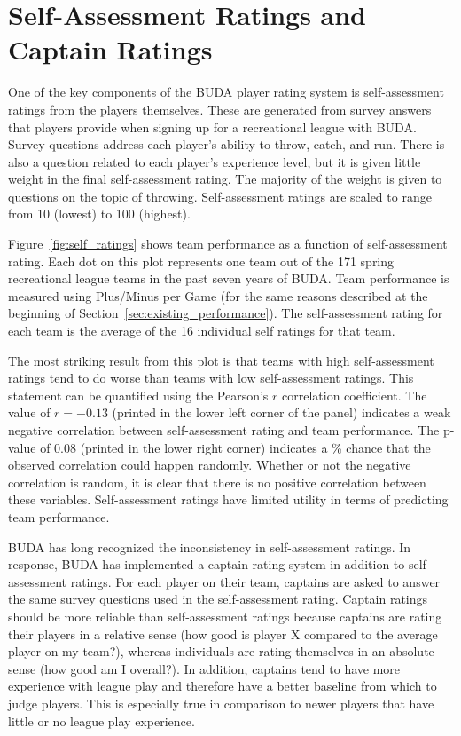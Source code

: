\section{Self-Assessment Ratings and Captain Ratings}\label{sec:self_rating}

One of the key components of the BUDA player rating system is self-assessment ratings from the players themselves.  These are generated from survey answers that players provide when signing up for a recreational league with BUDA. Survey questions address each player's ability to throw, catch, and run.  There is also a question related to each player's experience level, but it is given little weight in the final self-assessment rating. The majority of the weight is given to questions on the topic of throwing. Self-assessment ratings are scaled to range from 10 (lowest) to 100 (highest).

Figure~\ref{fig:self_ratings} shows team performance as a function of self-assessment rating. Each dot on this plot represents one team out of the 171 spring recreational league teams in the past seven years of BUDA.  Team performance is measured using Plus/Minus per Game (for the same reasons described at the beginning of Section~\ref{sec:existing_performance}). The self-assessment rating for each team is the average of the 16 individual self ratings for that team.

The most striking result from this plot is that teams with high self-assessment ratings tend to do worse than teams with low self-assessment ratings. This statement can be quantified using the Pearson's $r$ correlation coefficient. The value of $r = -0.13$ (printed in the lower left corner of the panel) indicates a weak negative correlation between self-assessment rating and team performance.   The p-value of 0.08 (printed in the lower right corner) indicates a \% chance that the observed correlation could happen randomly. Whether or not the negative correlation is random, it is clear that there is no positive correlation between these variables.  Self-assessment ratings have limited utility in terms of predicting team performance.

BUDA has long recognized the inconsistency in self-assessment ratings.  In response, BUDA has implemented a captain rating system in addition to self-assessment ratings.  For each player on their team, captains are asked to answer the same survey questions used in the self-assessment rating.  Captain ratings should be more reliable than self-assessment ratings because captains are rating their players in a relative sense (how good is player X compared to the average player on my team?), whereas individuals are rating themselves in an absolute sense (how good am I overall?). In addition, captains tend to have more experience with league play and therefore have a better baseline from which to judge players. This is especially true in comparison to newer players that have little or no league play experience.

